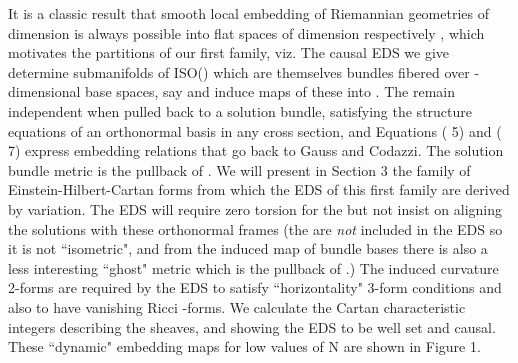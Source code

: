 \documentclass[a4paper,a4paper]{article}
\begin{document}
        It is a classic result \cite{gri87} that smooth local embedding
of Riemannian geometries of dimension \coordHE{} is always
possible into flat spaces of dimension respectively \coordHE{} ,
which motivates the partitions of our first family,  viz.  \coordHE{} The causal EDS we give  determine submanifolds of ISO(\coordHE{}) which
are themselves \coordHE{} bundles fibered over \coordHE{}-dimensional base spaces,  say \coordHE{} and induce maps of these into \coordHE{}. The \coordHE{} 
\coordHE{}  remain independent when pulled back to a solution
bundle,  satisfying the structure equations of an orthonormal basis in any cross
section,  and Equations ( 5) and ( 7) express embedding relations that
go back to Gauss and Codazzi. The solution bundle metric is the pullback
of \coordHE{}.  We will present in Section 3 the
family of Einstein-Hilbert-Cartan forms from which the EDS of this first
family are derived by variation.  The EDS will require zero torsion for
the \coordHE{} but  not insist on aligning the solutions with
these orthonormal frames (the \coordHE{} are {\itshape not}
included in the EDS so it is not ``isometric",  and  from the induced map of
bundle bases there is also a less interesting ``ghost" metric which is
the pullback of \coordHE{}.)  The
induced curvature 2-forms are required by the EDS to satisfy
``horizontality" 3-form conditions and also to have vanishing Ricci \coordHE{}-forms.  We
calculate the Cartan characteristic integers describing the sheaves,
and showing the EDS to be well set and causal. These ``dynamic" embedding maps for low
values of N are shown in Figure  1.
\end{document}
